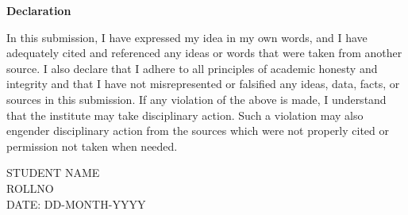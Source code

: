 \documentclass[a4paper, 11pt, oneside]{report}
\begin{document}

\begin{center}
   { \LARGE \textbf{Declaration}}
\end{center}
In this submission, I have expressed my idea in my own words, and I have adequately cited and referenced any ideas or words that were taken from another source. I also declare that I adhere to all principles of academic honesty and integrity and that I have not misrepresented or falsified any ideas, data, facts, or sources in this submission. If any violation of the above is made, I understand that the institute may take disciplinary action. Such a violation may also engender disciplinary action from the sources which were not properly cited or permission not taken when needed.

\vspace{1cm}\hspace{7cm} STUDENT NAME \\
\vspace{1cm}\hspace{9cm} ROLLNO \\
\vspace{1CM} DATE: DD-MONTH-YYYY

\newpage
\end{document}
